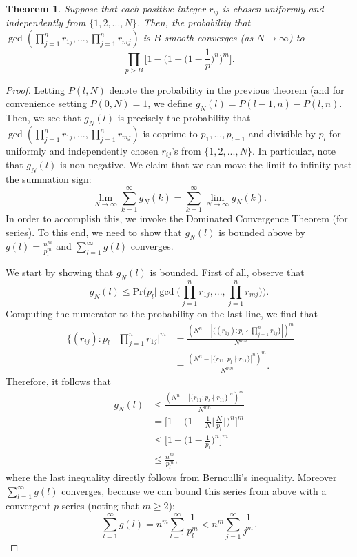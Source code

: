 \documentclass[12pt]{amsart}
\newtheorem{theorem}{Theorem}[subsection]
\theoremstyle{definition}
\begin{document}
\begin{theorem} Suppose that each positive integer $r_{ij}$ is chosen uniformly and independently from $\{1, 2, ..., N\}$. Then, the probability that $\gcd(\prod_{j=1}^n r_{1j}, ... , \prod_{j=1}^n r_{mj})$ is $B$-smooth converges (as $N \to \infty$) to
	$$\prod_{p>B} \Big[1 - \Big(1 - \Big(1 - \frac{1}{p}\Big)^n \Big)^m \Big].$$
\end{theorem}

\begin{proof}
	Letting $P(l, N)$ denote the probability in the previous theorem (and for convenience setting $P(0, N) = 1$, we define $g_N(l) = P(l-1, n) - P(l, n)$. Then, we see that $g_N(l)$ is precisely the probability that $\gcd(\prod_{j=1}^n r_{1j}, ... , \prod_{j=1}^n r_{mj})$ is coprime to $p_1, ..., p_{l-1}$ and divisible by $p_l$ for uniformly and independently chosen $r_{ij}$'s from $\{1, 2, ..., N\}$. In particular, note that $g_N(l)$ is non-negative. We claim that we can move the limit to infinity past the summation sign:
	$$\lim_{N \to \infty} \sum_{k=1}^{\infty} g_N(k) = \sum_{k=1}^{\infty} \lim_{N \to \infty} g_N(k).$$
	In order to accomplish this, we invoke the Dominated Convergence Theorem (for series). To this end, we need to show that $g_N(l)$ is bounded above by $g(l) = \frac{n^m}{p_l^m}$ and $\sum_{l=1}^{\infty} g(l)$ converges.
	
	We start by showing that $g_N(l)$ is bounded. First of all, observe that
	$$g_N(l) \leq \text{Pr}\Big(p_l \Big| \gcd\Big(\prod_{j=1}^n r_{1j}, ... , \prod_{j=1}^n r_{mj}\Big)\Big).$$
	Computing the numerator to the probability on the last line, we find that
	\begin{align*} 
		\Big|\{(r_{ij}) : p_l \mid \prod_{j=1}^n r_{1j}\Big|^m &= \frac{(N^n - |\{(r_{1j}) : p_l \nmid \prod_{j=1}^n r_{1j}\}|)^m}{N^{mn}}\\
		&= \frac{(N^n - |\{r_{11} : p_l \nmid r_{11}\}|^n)^m}{N^{mn}}. \end{align*}
	Therefore, it follows that
	\begin{align*} 
		g_N(l) &\leq \frac{(N^n - |\{r_{11} : p_l \nmid r_{11}\}|^n)^m}{N^{mn}}\\
		&= \Big[1 - \Big(1 - \frac{1}{N} \Big\lfloor \frac{N}{p_l}\Big\rfloor\Big)^n\Big]^m\\
		&\leq \Big[1 - \Big(1 - \frac{1}{p_l}\Big)^n\Big]^m\\
		&\leq \frac{n^m}{p_l^m},\end{align*}
	where the last inequality directly follows from Bernoulli's inequality. Moreover $\sum_{l=1}^{\infty} g(l)$ converges, because we can bound this series from above with a convergent $p$-series (noting that $m \geq 2$):
	$$\sum_{l=1}^{\infty} g(l) = n^m \sum_{l=1}^{\infty} \frac{1}{p_l^m} < n^m \sum_{j=1}^{\infty} \frac{1}{j^m}.$$
	

\end{proof}
\end{document}
